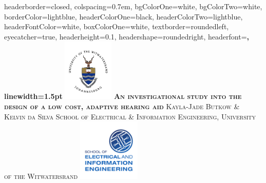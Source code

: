 \documentclass[landscape,a1paper,fontscale=0.45]{baposter} %
\begin{document}
\begin{poster}
{
headerborder=closed, %
colspacing=0.7em, %
bgColorOne=white, %
bgColorTwo=white, %
borderColor=lightblue, %
headerColorOne=black, %
headerColorTwo=lightblue, %
headerFontColor=white, %
boxColorOne=white, %
textborder=roundedleft, %
eyecatcher=true, %
headerheight=0.1\textheight, %
headershape=roundedright, %
headerfont=\Large\bf\textsc, %
linewidth=1.5pt %
}
%
{\includegraphics[height=8em]{wits.jpg}} %
{\bf\textsc{An investigational study into the design of a low cost, adaptive hearing aid}\vspace{0.3em}} %
{\textsc{ Kayla-Jade Butkow \& Kelvin da Silva \hspace{12pt} {\small School of Electrical \& Information Engineering, University of the Witwatersrand}}} %
{\includegraphics[height=8em]{EIE.pdf}} %


\end{poster}
\end{document}
